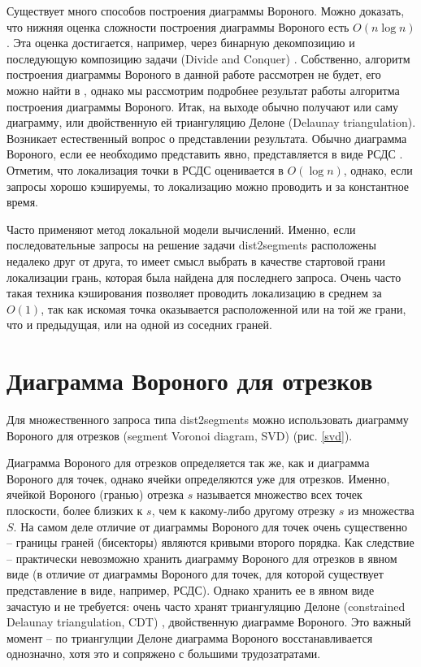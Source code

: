 Существует много способов построения диаграммы Вороного. Можно
доказать, что нижняя оценка сложности построения диаграммы Вороного есть
$O(n \log n)$. Эта оценка достигается, например, через бинарную декомпозицию и
последующую композицию задачи (Divide and Conquer) \cite{PrSh}. Собственно, алгоритм
построения диаграммы Вороного в данной работе рассмотрен не будет, его
можно найти в \cite{PrSh, CGAL}, однако мы рассмотрим подробнее результат работы
алгоритма построения диаграммы Вороного. Итак, на выходе обычно получают
или саму диаграмму, или двойственную ей триангуляцию Делоне (Delaunay
triangulation). Возникает естественный вопрос о представлении результата.
Обычно диаграмма Вороного, если ее необходимо представить явно,
представляется в виде РСДС \cite{PrSh}. Отметим, что локализация точки в РСДС
оценивается в $O(\log n)$, однако, если запросы хорошо кэшируемы, то
локализацию можно проводить и за константное время.

Часто применяют метод локальной модели вычислений. Именно, если
последовательные запросы на решение задачи dist2segments расположены недалеко
друг от друга, то имеет смысл выбрать в качестве стартовой грани локализации
грань, которая была найдена для последнего запроса. Очень часто такая
техника кэширования позволяет проводить локализацию в среднем за $O(1)$, так как
искомая точка оказывается расположенной или на той же грани, что и
предыдущая, или на одной из соседних граней.

\FloatBarrier
\section{Диаграмма Вороного для отрезков}

Для множественного запроса типа dist2segments можно использовать
диаграмму Вороного для отрезков (segment Voronoi diagram, SVD) \cite{SVD} (рис. \ref{svd}).


Диаграмма Вороного для отрезков определяется так же, как и диаграмма
Вороного для точек, однако ячейки определяются уже для отрезков. Именно,
ячейкой Вороного (гранью) отрезка $s$ называется множество всех точек
плоскости, более близких к $s$, чем к какому-либо другому отрезку $s$ из
множества $S$. На самом деле отличие от диаграммы Вороного для точек очень
существенно -- границы граней (бисекторы) являются кривыми второго
порядка. Как следствие -- практически невозможно хранить диаграмму Вороного
для отрезков в явном виде (в отличие от диаграммы Вороного для точек, для которой существует
представление в виде, например, РСДС).
Однако хранить ее в явном виде зачастую и не требуется: очень часто
хранят триангуляцию Делоне (constrained Delaunay
triangulation, CDT) \cite{CGAL}, двойственную диаграмме Вороного. Это важный момент -- 
по триангулции Делоне диаграмма Вороного восстанавливается
однозначно, хотя это и сопряжено с большими трудозатратами.

